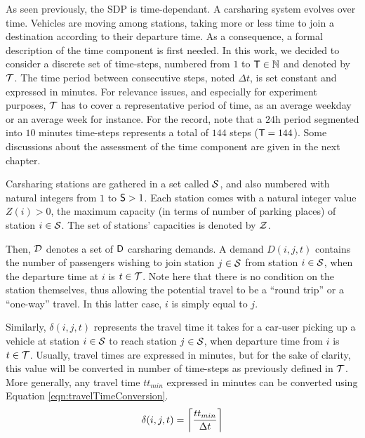 \begin{bibunit}[ieeetr]
As seen previously, the SDP is time-dependant.
A carsharing system evolves over time.
Vehicles are moving among stations, taking more or less time to join a destination according to their departure time.
As a consequence, a formal description of the time component is first needed.
In this work, we decided to consider a discrete set of time-steps, numbered from $1$ to $\nbTimeSteps \in \N$ and denoted by $\timeStepSet$.
The time period between consecutive steps, noted $\Delta t$, is set constant and expressed in minutes.
For relevance issues, and especially for experiment purposes, $\timeStepSet$ has to cover a representative period of time, as an average weekday or an average week for instance.
For the record, note that a $24$h period segmented into $10$ minutes time-steps represents a total of $144$ steps (\ie $\nbTimeSteps = 144$).
Some discussions about the assessment of the time component are given in the next chapter.


\medskip
Carsharing stations are gathered in a set called $\stationSet$, and also numbered with natural integers from $1$ to $\nbStations > 1$.
Each station comes with a natural integer value $Z(i) > 0$, the maximum capacity (in terms of number of parking places) of station $i \in \stationSet$.
The set of stations' capacities is denoted by $\sCapaSet$.
\medskip

Then, $\demandSet$ denotes a set of $\nbDemands$ carsharing demands.
A demand $D(i,j,t)$ contains the number of passengers wishing to join station $j \in \stationSet$ from station $i \in \stationSet$, when the departure time at $i$ is $t \in \timeStepSet$.
Note here that there is no condition on the station themselves, thus allowing the potential travel to be a ``round trip'' or a ``one-way'' travel.
In this latter case, $i$ is simply equal to $j$.
\medskip

Similarly, $\delta(i,j,t)$ represents the travel time it takes for a car-user picking up a vehicle at station $i \in \stationSet$ to reach station $j \in \stationSet$, when departure time from $i$ is $t \in \timeStepSet$.
Usually, travel times are expressed in minutes, but for the sake of clarity, this value will be converted in number of time-steps as previously defined in $\timeStepSet$.
More generally, any travel time $tt_{min}$ expressed in minutes can be converted using Equation \ref{eqn:travelTimeConversion}.
\begin{equation}\label{eqn:travelTimeConversion}
\delta(i,j,t) = \ceil*{\frac{tt_{min}}{\Delta t}}
\end{equation}


\end{bibunit}
